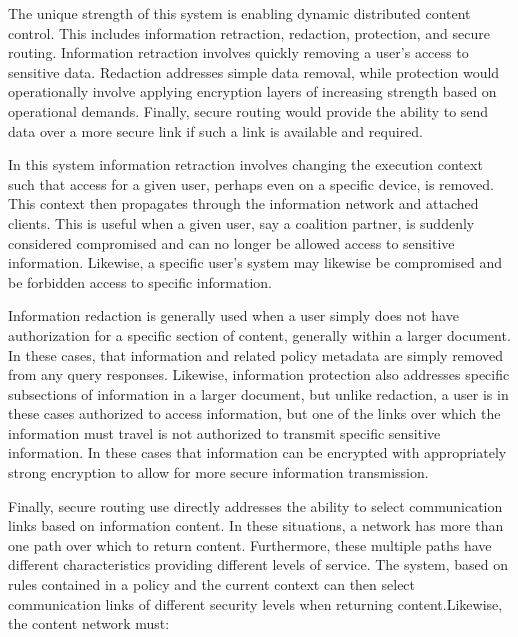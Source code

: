 The unique strength of this system is enabling dynamic distributed content control.  This includes information retraction, redaction, protection, and secure routing.  Information retraction involves quickly removing a user's access to sensitive data.  Redaction addresses simple data removal, while protection would operationally involve applying encryption layers of increasing strength based on operational demands.  Finally, secure routing would provide the ability to send data over a more secure link if such a link is available and required.

In this system information retraction involves changing the execution context such that access for a given user, perhaps even on a specific device, is removed.  This context then propagates through the information network and attached clients.  This is useful when a given user, say a coalition partner, is suddenly considered compromised and can no longer be allowed access to sensitive information.  Likewise, a specific user's system may likewise be compromised and be forbidden access to specific information.

Information redaction is generally used when a user simply does not have authorization for a specific section of content, generally within a larger document. In these cases, that information and related policy metadata are simply removed from any query responses.  Likewise, information protection also addresses specific subsections of information in a larger document, but unlike redaction, a user is in these cases authorized to access information, but one of the links over which the information must travel is not authorized to transmit specific sensitive information.  In these cases that information can be encrypted with appropriately strong encryption to allow for more secure information transmission.

Finally, secure routing use directly addresses the ability to select communication links based on information content.  In these situations, a network has more than one path over which to return content.  Furthermore, these multiple paths have different characteristics providing different levels of service.  The system, based on rules contained in a policy and the current context can then select communication links of different security levels when returning content.Likewise, the content network must:

